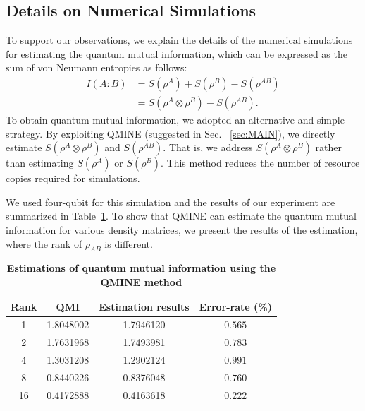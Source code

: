 \documentclass[aps,groupedaddress,superscriptaddress,amssymb,amsmath,amsbsy,amsfonts,twocolumn,pra]{revtex4}
\begin{document}
\subsection{Details on Numerical Simulations} \label{app:simul}
To support our observations, we explain the details of the numerical simulations for estimating the quantum mutual information, which can be expressed as the sum of von Neumann entropies as follows:
\begin{align*}
I\left(A:B\right) &= S(\rho^A) + S(\rho^B) - S(\rho^{AB}) \\
&= S\left(\rho^A\otimes\rho^B\right) - S(\rho^{AB}).
\end{align*}
To obtain quantum mutual information, we adopted an alternative and simple strategy. By exploiting QMINE (suggested in Sec. ~\ref{sec:MAIN}), we directly estimate $S(\rho^A\otimes\rho^B)$ and $S(\rho^{AB})$. That is, we address $S(\rho^A\otimes\rho^B)$ rather than estimating $S(\rho^{A})$ or $S(\rho^{B})$. This method reduces the number of resource copies required for simulations.

We used  four-qubit for this simulation and the results of our experiment are summarized in Table~\ref{tab:QMI}. To show that QMINE can estimate the quantum mutual information for various density matrices, we present the results of the estimation, where the rank of $\rho_{AB}$ is different.
\bigskip

\begin{table}[b]
\centering
\tabcolsep=0.05in
\begin{tabular}{c c c c} 
\hline\hline
{Rank } & {QMI} & {Estimation results} & {Error-rate (\%)} \\
\hline
1 & 1.8048002 & 1.7946120 & $0.565$ \\
2 & 1.7631968 & 1.7493981 & $0.783$ \\
4 & 1.3031208 & 1.2902124 & $0.991$ \\
8 & 0.8440226 & 0.8376048 & $0.760$ \\
16 & 0.4172888 & 0.4163618 & $0.222$ \\
\hline\hline
\end{tabular}
\caption{\label{tab:QMI} \textbf{Estimations of quantum mutual information using the QMINE method}}
\end{table}
\end{document}
